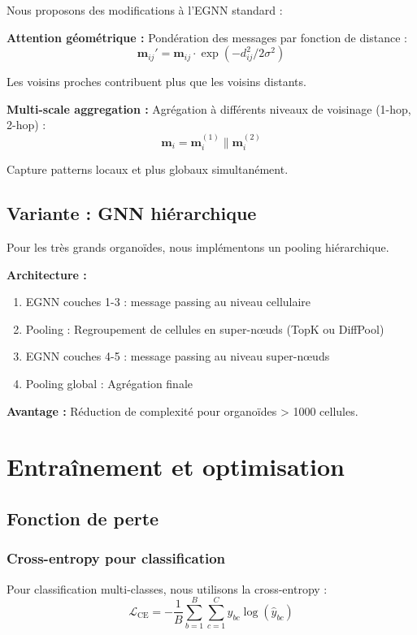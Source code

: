Nous proposons des modifications à l'EGNN standard :

\textbf{Attention géométrique :}
Pondération des messages par fonction de distance :
\[
\mathbf{m}_{ij}' = \mathbf{m}_{ij} \cdot \exp(-d_{ij}^2 / 2\sigma^2)
\]

Les voisins proches contribuent plus que les voisins distants.

\textbf{Multi-scale aggregation :}
Agrégation à différents niveaux de voisinage (1-hop, 2-hop) :
\[
\mathbf{m}_i = \mathbf{m}_i^{(1)} \| \mathbf{m}_i^{(2)}
\]

Capture patterns locaux et plus globaux simultanément.

\subsection{Variante : GNN hiérarchique}

Pour les très grands organoïdes, nous implémentons un pooling hiérarchique.

\textbf{Architecture :}
\begin{enumerate}
    \item EGNN couches 1-3 : message passing au niveau cellulaire
    \item Pooling : Regroupement de cellules en super-nœuds (TopK ou DiffPool)
    \item EGNN couches 4-5 : message passing au niveau super-nœuds
    \item Pooling global : Agrégation finale
\end{enumerate}

\textbf{Avantage :} Réduction de complexité pour organoïdes > 1000 cellules.

\section{Entraînement et optimisation}

\subsection{Fonction de perte}

\subsubsection{Cross-entropy pour classification}

Pour classification multi-classes, nous utilisons la cross-entropy :
\[
\mathcal{L}_{\text{CE}} = -\frac{1}{B}\sum_{b=1}^B \sum_{c=1}^C y_{bc} \log(\hat{y}_{bc})
\]

